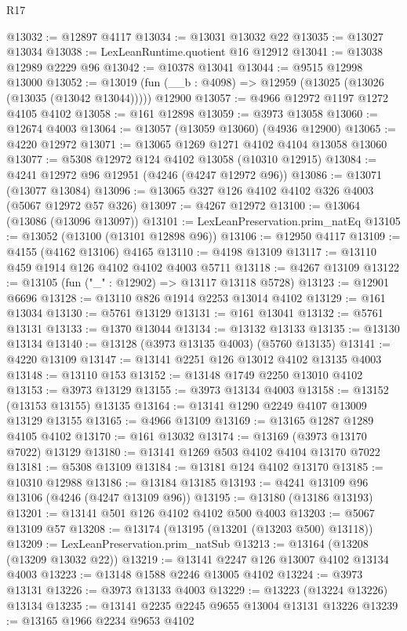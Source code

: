 \begin{lexlean}{R17}
\begin{coremodule}
@13032 := @12897 @4117
@13034 := @13031 @13032 @22
@13035 := @13027 @13034
@13038 := LexLeanRuntime.quotient @16 @12912
@13041 := @13038 @12989 @2229 @96
@13042 := @10378 @13041
@13044 := @9515 @12998 @13000
@13052 := @13019 (fun (__b : @4098) => @12959 (@13025 (@13026 (@13035 (@13042 @13044))))) @12900
@13057 := @4966 @12972 @1197 @1272 @4105 @4102
@13058 := @161 @12898
@13059 := @3973 @13058
@13060 := @12674 @4003
@13064 := @13057 (@13059 @13060) (@4936 @12900)
@13065 := @4220 @12972
@13071 := @13065 @1269 @1271 @4102 @4104 @13058 @13060
@13077 := @5308 @12972 @124 @4102 @13058 (@10310 @12915)
@13084 := @4241 @12972 @96 @12951 (@4246 (@4247 @12972 @96))
@13086 := @13071 (@13077 @13084)
@13096 := @13065 @327 @126 @4102 @4102 @326 @4003 (@5067 @12972 @57 @326)
@13097 := @4267 @12972
@13100 := @13064 (@13086 (@13096 @13097))
@13101 := LexLeanPreservation.prim_natEq
@13105 := @13052 (@13100 (@13101 @12898 @96))
@13106 := @12950 @4117
@13109 := @4155 (@4162 @13106) @4165
@13110 := @4198 @13109
@13117 := @13110 @459 @1914 @126 @4102 @4102 @4003 @5711
@13118 := @4267 @13109
@13122 := @13105 (fun ("_" : @12902) => @13117 @13118 @5728)
@13123 := @12901 @6696
@13128 := @13110 @826 @1914 @2253 @13014 @4102
@13129 := @161 @13034
@13130 := @5761 @13129
@13131 := @161 @13041
@13132 := @5761 @13131
@13133 := @1370 @13044
@13134 := @13132 @13133
@13135 := @13130 @13134
@13140 := @13128 (@3973 @13135 @4003) (@5760 @13135)
@13141 := @4220 @13109
@13147 := @13141 @2251 @126 @13012 @4102 @13135 @4003
@13148 := @13110 @153
@13152 := @13148 @1749 @2250 @13010 @4102
@13153 := @3973 @13129
@13155 := @3973 @13134 @4003
@13158 := @13152 (@13153 @13155) @13135
@13164 := @13141 @1290 @2249 @4107 @13009 @13129 @13155
@13165 := @4966 @13109
@13169 := @13165 @1287 @1289 @4105 @4102
@13170 := @161 @13032
@13174 := @13169 (@3973 @13170 @7022) @13129
@13180 := @13141 @1269 @503 @4102 @4104 @13170 @7022
@13181 := @5308 @13109
@13184 := @13181 @124 @4102 @13170
@13185 := @10310 @12988
@13186 := @13184 @13185
@13193 := @4241 @13109 @96 @13106 (@4246 (@4247 @13109 @96))
@13195 := @13180 (@13186 @13193)
@13201 := @13141 @501 @126 @4102 @4102 @500 @4003
@13203 := @5067 @13109 @57
@13208 := @13174 (@13195 (@13201 (@13203 @500) @13118))
@13209 := LexLeanPreservation.prim_natSub
@13213 := @13164 (@13208 (@13209 @13032 @22))
@13219 := @13141 @2247 @126 @13007 @4102 @13134 @4003
@13223 := @13148 @1588 @2246 @13005 @4102
@13224 := @3973 @13131
@13226 := @3973 @13133 @4003
@13229 := @13223 (@13224 @13226) @13134
@13235 := @13141 @2235 @2245 @9655 @13004 @13131 @13226
@13239 := @13165 @1966 @2234 @9653 @4102

\end{coremodule}
\end{lexlean}
